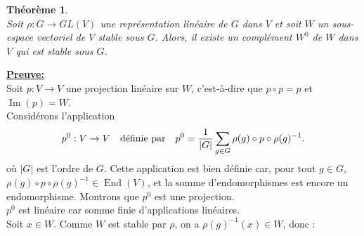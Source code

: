 \documentclass[a4paper, 14pt]{report}
\newtheorem{theorem}{Théorème}[section]
\begin{document}
\begin{onehalfspace}
{			
			\begin{theorem}\cite{serre1971representation} \\
				Soit $\rho : G \to GL(V)$ une représentation linéaire de $G$ dans $V$ et soit 
				$W$ un sous-espace vectoriel de $V$ stable sous $G$. Alors, il existe un complément $W^0$ de $W$ dans $V$ qui est stable sous $G$.
			\end{theorem}
			
			\textbf{\underline{Preuve:}}\\
			Soit \( p : V \to V \) une projection linéaire sur \( W \), c’est-à-dire que \( p \circ p = p \) et \( \operatorname{Im}(p) = W \).\\
			Considérons l'application
			\[
			p^0 : V \to V \quad \text{définie par} \quad  \text{\(	p^0 = \frac{1}{|G|} \sum_{g \in G} \rho(g) \circ p \circ \rho(g)^{-1}.\)} 
			\]
			où $|G|$ est l'ordre de $G$. Cette application est bien définie car, pour tout \( g \in G \), \( \rho(g) \circ p \circ \rho(g)^{-1} \in \operatorname{End}(V) \), et la somme d'endomorphismes est encore un endomorphisme. 
			Montrons que $p^0$ est une projection.\\
			$p^0$ est linéaire car somme finie d'applications linéaires.\\
			Soit $x \in W$. Comme $W$ est stable par $\rho$, on a \( \rho(g)^{-1}(x) \in W \), donc :
			
}
\end{onehalfspace}
\end{document}
